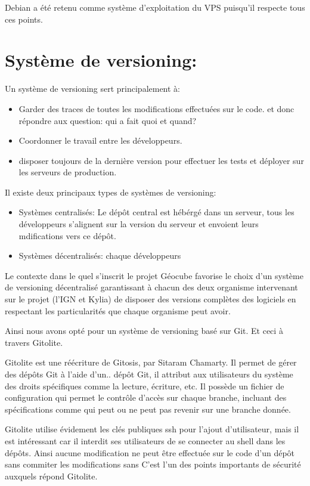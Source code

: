 \documentclass{themeensg}
\begin{document}
Debian a été retenu comme système d'exploitation du VPS puisqu'il respecte tous ces points.

\section{Système de versioning:}
Un système de versioning sert principalement à:

\begin{itemize}
\item Garder des traces de toutes les modifications effectuées sur le code. et donc répondre aux question: qui a fait quoi et quand?
\item Coordonner le travail entre les développeurs.
\item disposer toujours de la dernière version pour effectuer les tests et déployer sur les serveurs de production.
\end{itemize}

Il existe deux principaux types de systèmes de versioning:
\begin{itemize}
\item Systèmes centralisés: Le dépôt central est hébérgé dans un serveur, tous les développeurs s'alignent sur la version du serveur et envoient leurs mdifications vers ce dépôt.
\item Systèmes décentralisés: chaque développeurs
\end{itemize}

Le contexte dans le quel s'inscrit le projet Géocube favorise le choix d'un système de versioning décentralisé garantissant à chacun des deux organisme intervenant sur le projet (l'IGN et Kylia) de disposer des versions complètes des logiciels en respectant les particularités que chaque organisme peut avoir.

Ainsi nous avons opté pour un système de versioning basé sur Git. Et ceci à travers Gitolite.

Gitolite est une réécriture de Gitosis, par Sitaram Chamarty. Il permet de gérer des dépôts Git à l'aide d'un.. dépôt Git, il attribut aux utilisateurs du système des droits spécifiques comme la lecture, écriture, etc. Il possède un fichier de configuration qui permet le contrôle d'accès sur chaque branche, incluant des spécifications comme qui peut ou ne peut pas revenir sur une branche donnée.

Gitolite utilise évidement les clés publiques ssh pour l'ajout d'utilisateur, mais il est intéressant car il interdit ses utilisateurs de se connecter au shell dans les dépôts. Ainsi aucune modification ne peut être effectuée sur le code d'un dépôt sans commiter les modifications sans C'est l'un des points importants de sécurité auxquels répond Gitolite.
\end{document}
